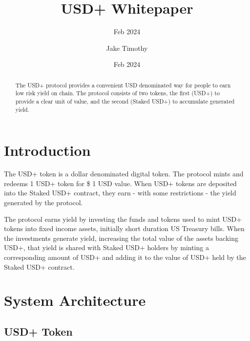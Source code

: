 \documentclass[sigconf,nonacm,prologue,table]{acmart}
\begin{document}
\title{USD+ Whitepaper}
\subtitle{Feb 2024}
\date{Feb 2024}

\author{Jake Timothy}
\affiliation{}

\begin{teaserfigure}
\caption*{
    \hspace{\textwidth}
    }
\end{teaserfigure}

\renewcommand{\shortauthors}{Timothy}

\begin{abstract}

    The USD+ protocol provides a convenient USD denominated way for people to earn low risk yield on chain. The protocol consists of two tokens, the first (USD+) to provide a clear unit of value, and the second (Staked USD+) to accumulate generated yield.

\end{abstract}

\maketitle

\section{Introduction}
\label{sec:introduction}

The USD+ token is a dollar denominated digital token. The protocol mints and redeems 1 USD+ token for \$ 1 USD value. When USD+ tokens are deposited into the Staked USD+ contract, they earn - with some restrictions - the yield generated by the protocol.

The protocol earns yield by investing the funds and tokens used to mint USD+ tokens into fixed income assets, initially short duration US Treasury bills. When the investments generate yield, increasing the total value of the assets backing USD+, that yield is shared with Staked USD+ holders by minting a corresponding amount of USD+ and adding it to the value of USD+ held by the Staked USD+ contract.

\section{System Architecture} 
\label{sec:system}

\subsection{USD+ Token}
\end{document}
